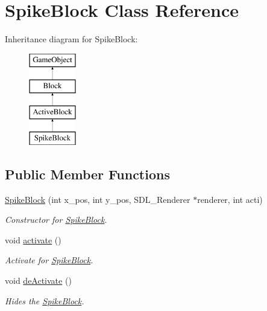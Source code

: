 \hypertarget{class_spike_block}{}\section{Spike\+Block Class Reference}
\label{class_spike_block}
Inheritance diagram for Spike\+Block\+:\begin{figure}[H]
\begin{center}
\leavevmode
\includegraphics[height=4.000000cm]{class_spike_block}
\end{center}
\end{figure}
\subsection*{Public Member Functions}
\begin{DoxyCompactItemize}
\item 
\hyperlink{class_spike_block_aabeaf2df666bff3f84b7ad49088d3954}{Spike\+Block} (int x\+\_\+pos, int y\+\_\+pos, S\+D\+L\+\_\+\+Renderer $\ast$renderer, int acti)
\begin{DoxyCompactList}\small\item\em Constructor for \hyperlink{class_spike_block}{Spike\+Block}. \end{DoxyCompactList}\item 
void \hyperlink{class_spike_block_a7ade107c2b0c33d90c2743453761c220}{activate} ()
\begin{DoxyCompactList}\small\item\em Activate for \hyperlink{class_spike_block}{Spike\+Block}. \end{DoxyCompactList}\item 
\hypertarget{class_spike_block_a147f0fc4fba3f140e46d7d72496ada29}{}void \hyperlink{class_spike_block_a147f0fc4fba3f140e46d7d72496ada29}{de\+Activate} ()\label{class_spike_block_a147f0fc4fba3f140e46d7d72496ada29}

\begin{DoxyCompactList}\small\item\em Hides the \hyperlink{class_spike_block}{Spike\+Block}. \end{DoxyCompactList}\end{DoxyCompactItemize}
